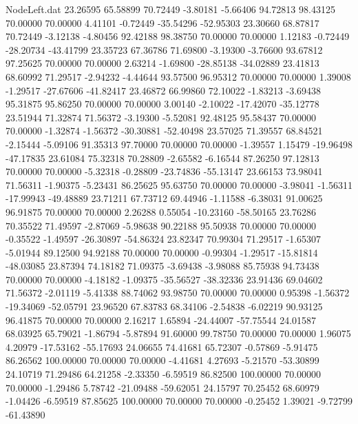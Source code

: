 \begin{filecontents}{NodeLeft.dat}
  23.26595   65.58899   70.72449    -3.80181   -5.66406   94.72813   98.43125   70.00000   70.00000    4.41101   -0.72449  -35.54296  -52.95303
  23.30660   68.87817   70.72449    -3.12138   -4.80456   92.42188   98.38750   70.00000   70.00000    1.12183   -0.72449  -28.20734  -43.41799
  23.35723   67.36786   71.69800    -3.19300   -3.76600   93.67812   97.25625   70.00000   70.00000    2.63214   -1.69800  -28.85138  -34.02889
  23.41813   68.60992   71.29517    -2.94232   -4.44644   93.57500   96.95312   70.00000   70.00000    1.39008   -1.29517  -27.67606  -41.82417
  23.46872   66.99860   72.10022    -1.83213   -3.69438   95.31875   95.86250   70.00000   70.00000    3.00140   -2.10022  -17.42070  -35.12778
  23.51944   71.32874   71.56372    -3.19300   -5.52081   92.48125   95.58437   70.00000   70.00000   -1.32874   -1.56372  -30.30881  -52.40498
  23.57025   71.39557   68.84521    -2.15444   -5.09106   91.35313   97.70000   70.00000   70.00000   -1.39557    1.15479  -19.96498  -47.17835
  23.61084   75.32318   70.28809    -2.65582   -6.16544   87.26250   97.12813   70.00000   70.00000   -5.32318   -0.28809  -23.74836  -55.13147
  23.66153   73.98041   71.56311    -1.90375   -5.23431   86.25625   95.63750   70.00000   70.00000   -3.98041   -1.56311  -17.99943  -49.48889
  23.71211   67.73712   69.44946    -1.11588   -6.38031   91.00625   96.91875   70.00000   70.00000    2.26288    0.55054  -10.23160  -58.50165
  23.76286   70.35522   71.49597    -2.87069   -5.98638   90.22188   95.50938   70.00000   70.00000   -0.35522   -1.49597  -26.30897  -54.86324
  23.82347   70.99304   71.29517    -1.65307   -5.01944   89.12500   94.92188   70.00000   70.00000   -0.99304   -1.29517  -15.81814  -48.03085
  23.87394   74.18182   71.09375    -3.69438   -3.98088   85.75938   94.73438   70.00000   70.00000   -4.18182   -1.09375  -35.56527  -38.32336
  23.91436   69.04602   71.56372    -2.01119   -5.41338   88.74062   93.98750   70.00000   70.00000    0.95398   -1.56372  -19.34069  -52.05791
  23.96520   67.83783   68.34106    -2.54838   -6.02219   90.93125   96.41875   70.00000   70.00000    2.16217    1.65894  -24.44007  -57.75544
  24.01587   68.03925   65.79021    -1.86794   -5.87894   91.60000   99.78750   70.00000   70.00000    1.96075    4.20979  -17.53162  -55.17693
  24.06655   74.41681   65.72307    -0.57869   -5.91475   86.26562  100.00000   70.00000   70.00000   -4.41681    4.27693   -5.21570  -53.30899
  24.10719   71.29486   64.21258    -2.33350   -6.59519   86.82500  100.00000   70.00000   70.00000   -1.29486    5.78742  -21.09488  -59.62051
  24.15797   70.25452   68.60979    -1.04426   -6.59519   87.85625  100.00000   70.00000   70.00000   -0.25452    1.39021   -9.72799  -61.43890

\end{filecontents}
